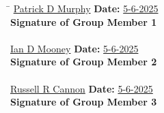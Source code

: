 \documentclass{article}
\begin{document}
\begin{tabbing}
\hspace{8cm}\=\kill
\underline{\hspace{1.7cm}Patrick D Murphy} \> \textbf{Date:} \underline{\hspace{1cm} 5-6-2025} \\
\textbf{Signature of Group Member 1} \\
\\
\underline{\hspace{1.8cm} Ian D Mooney} \> \textbf{Date:} \underline{\hspace{1cm} 5-6-2025} \\
\textbf{Signature of Group Member 2} \\
\\
\underline{\hspace{1.8cm}Russell R Cannon} \> \textbf{Date:} \underline{\hspace{1.2cm}5-6-2025} \\
\textbf{Signature of Group Member 3} \\
\\
\end{tabbing}
\end{document}
